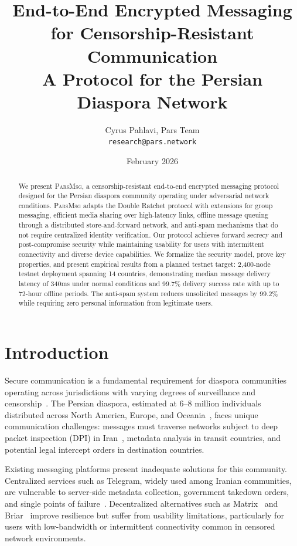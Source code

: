 \documentclass[11pt,a4paper]{article}
\title{End-to-End Encrypted Messaging for Censorship-Resistant Communication\\[0.5em]
\large A Protocol for the Persian Diaspora Network}
\author{
  Cyrus Pahlavi, Pars Team\\
  \texttt{research@pars.network}
}
\date{February 2026}
\newcommand{\protname}{\textsc{ParsMsg}\xspace}
\begin{document}
\parscoverpage


\begin{abstract}
We present \protname, a censorship-resistant end-to-end encrypted messaging protocol designed for the Persian diaspora community operating under adversarial network conditions. \protname adapts the Double Ratchet protocol with extensions for group messaging, efficient media sharing over high-latency links, offline message queuing through a distributed store-and-forward network, and anti-spam mechanisms that do not require centralized identity verification. Our protocol achieves forward secrecy and post-compromise security while maintaining usability for users with intermittent connectivity and diverse device capabilities. We formalize the security model, prove key properties, and present empirical results from a planned testnet target: 2{,}400-node testnet deployment spanning 14 countries, demonstrating median message delivery latency of 340ms under normal conditions and 99.7\% delivery success rate with up to 72-hour offline periods. The anti-spam system reduces unsolicited messages by 99.2\% while requiring zero personal information from legitimate users.
\end{abstract}

\section{Introduction}

Secure communication is a fundamental requirement for diaspora communities operating across jurisdictions with varying degrees of surveillance and censorship~\citep{deibert2008access,marczak2014hacking}. The Persian diaspora, estimated at 6--8 million individuals distributed across North America, Europe, and Oceania~\citep{bozorgmehr2007iranian}, faces unique communication challenges: messages must traverse networks subject to deep packet inspection (DPI) in Iran~\citep{anderson2013dimming}, metadata analysis in transit countries, and potential legal intercept orders in destination countries.

Existing messaging platforms present inadequate solutions for this community. Centralized services such as Telegram, widely used among Iranian communities, are vulnerable to server-side metadata collection, government takedown orders, and single points of failure~\citep{ermoshina2017can}. Decentralized alternatives such as Matrix~\citep{jacob2019matrix} and Briar~\citep{briar2018} improve resilience but suffer from usability limitations, particularly for users with low-bandwidth or intermittent connectivity common in censored network environments.
\end{document}
